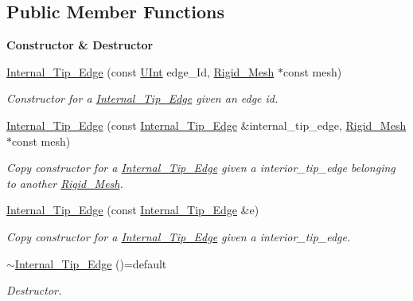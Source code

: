 \subsection*{Public Member Functions}
\begin{Indent}{\bf Constructor \& Destructor}\par
\begin{DoxyCompactItemize}
\item 
\hyperlink{classFVCode3D_1_1Rigid__Mesh_1_1Internal__Tip__Edge_a72df5810047bdf0fa4a90b479a8d1121}{Internal\+\_\+\+Tip\+\_\+\+Edge} (const \hyperlink{namespaceFVCode3D_a4bf7e328c75d0fd504050d040ebe9eda}{U\+Int} edge\+\_\+\+Id, \hyperlink{classFVCode3D_1_1Rigid__Mesh}{Rigid\+\_\+\+Mesh} $\ast$const mesh)
\begin{DoxyCompactList}\small\item\em Constructor for a \hyperlink{classFVCode3D_1_1Rigid__Mesh_1_1Internal__Tip__Edge}{Internal\+\_\+\+Tip\+\_\+\+Edge} given an edge id. \end{DoxyCompactList}\item 
\hyperlink{classFVCode3D_1_1Rigid__Mesh_1_1Internal__Tip__Edge_abfeee084644b2e286cae2b1f54dd5725}{Internal\+\_\+\+Tip\+\_\+\+Edge} (const \hyperlink{classFVCode3D_1_1Rigid__Mesh_1_1Internal__Tip__Edge}{Internal\+\_\+\+Tip\+\_\+\+Edge} \&internal\+\_\+tip\+\_\+edge, \hyperlink{classFVCode3D_1_1Rigid__Mesh}{Rigid\+\_\+\+Mesh} $\ast$const mesh)
\begin{DoxyCompactList}\small\item\em Copy constructor for a \hyperlink{classFVCode3D_1_1Rigid__Mesh_1_1Internal__Tip__Edge}{Internal\+\_\+\+Tip\+\_\+\+Edge} given a interior\+\_\+tip\+\_\+edge belonging to another \hyperlink{classFVCode3D_1_1Rigid__Mesh}{Rigid\+\_\+\+Mesh}. \end{DoxyCompactList}\item 
\hyperlink{classFVCode3D_1_1Rigid__Mesh_1_1Internal__Tip__Edge_a7c363edbfdc751972e6666389f44d861}{Internal\+\_\+\+Tip\+\_\+\+Edge} (const \hyperlink{classFVCode3D_1_1Rigid__Mesh_1_1Internal__Tip__Edge}{Internal\+\_\+\+Tip\+\_\+\+Edge} \&e)
\begin{DoxyCompactList}\small\item\em Copy constructor for a \hyperlink{classFVCode3D_1_1Rigid__Mesh_1_1Internal__Tip__Edge}{Internal\+\_\+\+Tip\+\_\+\+Edge} given a interior\+\_\+tip\+\_\+edge. \end{DoxyCompactList}\item 
\hyperlink{classFVCode3D_1_1Rigid__Mesh_1_1Internal__Tip__Edge_a4334fd925f5aaf122058e5342a442a4c}{$\sim$\+Internal\+\_\+\+Tip\+\_\+\+Edge} ()=default
\begin{DoxyCompactList}\small\item\em Destructor. \end{DoxyCompactList}\end{DoxyCompactItemize}
\end{Indent}
